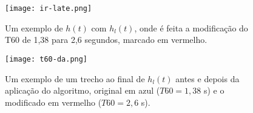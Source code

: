 \begin{figure}[H]
    \centering
    \texttt{[image: ir-late.png]}
    \caption{Um exemplo de $h(t)$ com $h_l(t)$, onde é feita a modificação do T60 de 1,38 para 2,6 segundos, marcado em vermelho.}
    \label{fig:ir-late}
\end{figure} 

\begin{figure}[H]
    \centering
    \texttt{[image: t60-da.png]}
    \caption{Um exemplo de um trecho ao final de $h_l(t)$ antes e depois da aplicação do algoritmo, original em azul ($T60=1,38$ s) e o modificado em vermelho ($T60=2,6$ s).}
    \label{fig:t60-da}
\end{figure} 